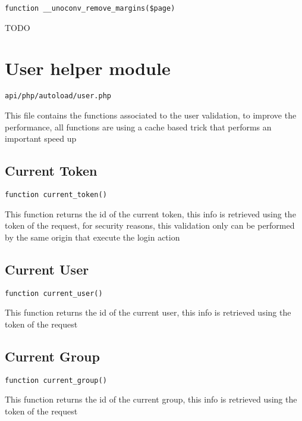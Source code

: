 \documentclass[a4paper]{book}
\begin{document}
\begin{lstlisting}
function __unoconv_remove_margins($page)
\end{lstlisting}

TODO

\hypertarget{toc305}{}
\section{User helper module}

\begin{lstlisting}
api/php/autoload/user.php
\end{lstlisting}

This file contains the functions associated to the user validation, to
improve the performance, all functions are using a cache based trick
that performs an important speed up

\hypertarget{toc306}{}
\subsection{Current Token}

\begin{lstlisting}
function current_token()
\end{lstlisting}

This function returns the id of the current token, this info is retrieved
using the token of the request, for security reasons, this validation only
can be performed by the same origin that execute the login action

\hypertarget{toc307}{}
\subsection{Current User}

\begin{lstlisting}
function current_user()
\end{lstlisting}

This function returns the id of the current user, this info is retrieved
using the token of the request

\hypertarget{toc308}{}
\subsection{Current Group}

\begin{lstlisting}
function current_group()
\end{lstlisting}

This function returns the id of the current group, this info is retrieved
using the token of the request
\end{document}
